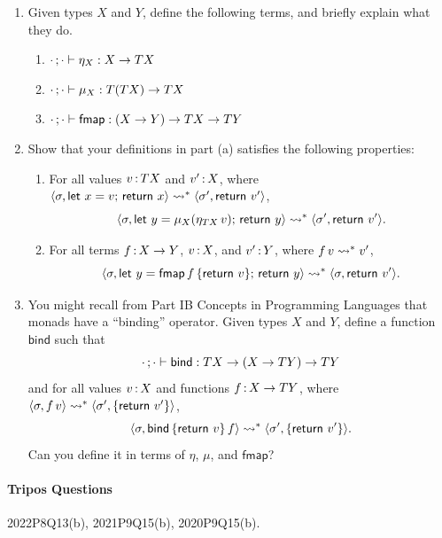 \documentclass[11pt,a4paper,twoside]{article}
\begin{document}
\begin{enumerate}[label=(\alph*)]
  \item Given types $X$ and $Y$, define the following terms, and
    briefly explain what they do.
    \begin{enumerate}[label=(\roman*)]
      \item $\cdot\, ; \cdot \vdash \eta_X : X \to TX$
      \item $\cdot\, ; \cdot \vdash \mu_{X} : T(TX) \to TX$
      \item $\cdot\, ; \cdot \vdash \mathsf{fmap} : (X \to Y) \to TX \to TY$
    \end{enumerate}

  \item Show that your definitions in part (a) satisfies the
    following properties:
    \begin{enumerate}[label=(\roman*)]
      \item For all values $v \,{:}\, TX$ and $v' \,{:}\, X$, where
        $\langle \sigma, \mathsf{let}\ x = v;\, \mathsf{return}\ x \rangle \rightsquigarrow^*
        \langle \sigma', \mathsf{return}\ v' \rangle$,
        \[
          \langle \sigma, \mathsf{let}\ y = \mu_X(\eta_{TX} \, v);\, \mathsf{return}\ y \rangle
          \rightsquigarrow^*
          \langle \sigma', \mathsf{return}\ v' \rangle.
        \]

      \item For all terms $f \,{:}\, X \to Y$, $v \,{:}\, X$, and
        $v' \,{:}\, Y$, where $f \, v \rightsquigarrow^* v'$,
        \[
          \langle \sigma, \mathsf{let}\ y = \mathsf{fmap} \, f \, \{\mathsf{return}\ v\};\, \mathsf{return}\ y \rangle
          \rightsquigarrow^*
          \langle \sigma, \mathsf{return}\ v' \rangle.
        \]

    \end{enumerate}

  \item You might recall from Part IB Concepts in Programming
    Languages that monads have a ``binding'' operator.
    Given types $X$ and $Y$, define a function $\mathsf{bind}$ such that
    \[ \cdot\, ; \cdot \vdash \mathsf{bind} : TX \to (X \to TY) \to TY \]
    and for all values $v \,{:}\, X$ and functions $f \,{:}\, X \to TY$,
    where $\langle \sigma, f \, v \rangle \rightsquigarrow^* \langle \sigma', \{\mathsf{return}\ v'\} \rangle$,
    \[
      \langle \sigma, \mathsf{bind} \, \{\mathsf{return}\ v\} \, f \rangle
      \rightsquigarrow^*
      \langle \sigma', \{\mathsf{return}\ v'\} \rangle.
    \]
    Can you define it in terms of $\eta$, $\mu$, and $\mathsf{fmap}$?
\end{enumerate}

\paragraph{Tripos Questions} 2022P8Q13(b), 2021P9Q15(b), 2020P9Q15(b).
\end{document}
